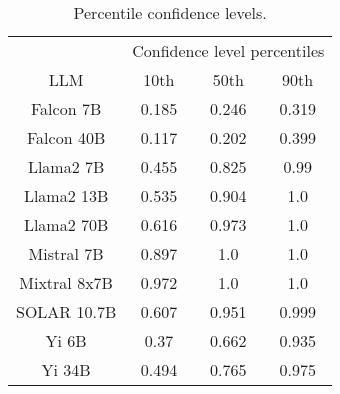 \begin{table*}
\centering
\begin{tabular}{c|c|c|c}
& \multicolumn{3}{c}{Confidence level percentiles} \\ 
LLM & 10th & 50th & 90th\\ \hline
Falcon 7B & 0.185 & 0.246 & 0.319\\
Falcon 40B & 0.117 & 0.202 & 0.399\\
Llama2 7B & 0.455 & 0.825 & 0.99\\
Llama2 13B & 0.535 & 0.904 & 1.0\\
Llama2 70B & 0.616 & 0.973 & 1.0\\
Mistral 7B & 0.897 & 1.0 & 1.0\\
Mixtral 8x7B & 0.972 & 1.0 & 1.0\\
SOLAR 10.7B & 0.607 & 0.951 & 0.999\\
Yi 6B & 0.37 & 0.662 & 0.935\\
Yi 34B & 0.494 & 0.765 & 0.975\\
\hline
\end{tabular}
\caption{Percentile confidence levels.}
\label{tab:percentile_conf}
\end{table*}
